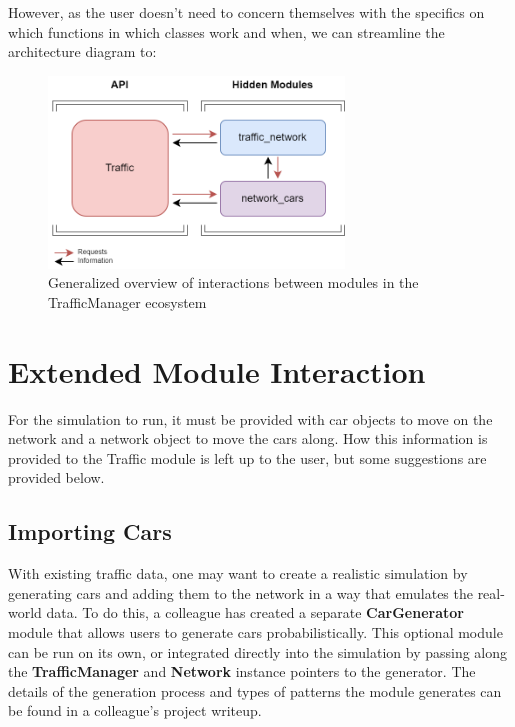 \noindent  However, as the user doesn't need to concern themselves with the specifics on which functions in which classes work and when, we can streamline the architecture diagram to:

\begin{figure}[H]
    \centering
	\includegraphics[width=0.7\textwidth]{tex files/Figures/simplified_essentials.png}
	\caption[Software Interaction:  User View]{Generalized overview of interactions between modules in the TrafficManager ecosystem}
	\label{fig:interactions_simplified}
\end{figure}



\section{Extended Module Interaction}

\par For the simulation to run, it must be provided with car objects to move on the network and a network object to move the cars along.  How this information is provided to the Traffic module is left up to the user, but some suggestions are provided below.

\subsection{Importing Cars}

\par With existing traffic data, one may want to create a realistic simulation by generating cars and adding them to the network in a way that emulates the real-world data.  To do this, a colleague has created a separate \textbf{CarGenerator} module that allows users to generate cars probabilistically.  This optional module can be run on its own, or integrated directly into the simulation by passing along the \textbf{TrafficManager} and \textbf{Network} instance pointers to the generator.  The details of the generation process and types of patterns the module generates can be found in a colleague's project writeup. \\

